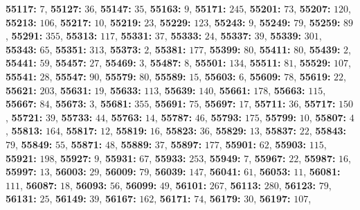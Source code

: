 \textsf{\bfseries 55117:} $7$, \textsf{\bfseries 55127:} $36$, \textsf{\bfseries 55147:} $35$, \textsf{\bfseries 55163:} $9$, \textsf{\bfseries 55171:} $245$, \textsf{\bfseries 55201:} $73$, \textsf{\bfseries 55207:} $120$, \textsf{\bfseries 55213:} $106$, \textsf{\bfseries 55217:} $10$, \textsf{\bfseries 55219:} $23$, \textsf{\bfseries 55229:} $123$, \textsf{\bfseries 55243:} $9$, \textsf{\bfseries 55249:} $79$, \textsf{\bfseries 55259:} $89$, \textsf{\bfseries 55291:} $355$, \textsf{\bfseries 55313:} $117$, \textsf{\bfseries 55331:} $37$, \textsf{\bfseries 55333:} $24$, \textsf{\bfseries 55337:} $39$, \textsf{\bfseries 55339:} $301$, \textsf{\bfseries 55343:} $65$, \textsf{\bfseries 55351:} $313$, \textsf{\bfseries 55373:} $2$, \textsf{\bfseries 55381:} $177$, \textsf{\bfseries 55399:} $80$, \textsf{\bfseries 55411:} $80$, \textsf{\bfseries 55439:} $2$, \textsf{\bfseries 55441:} $59$, \textsf{\bfseries 55457:} $27$, \textsf{\bfseries 55469:} $3$, \textsf{\bfseries 55487:} $8$, \textsf{\bfseries 55501:} $134$, \textsf{\bfseries 55511:} $81$, \textsf{\bfseries 55529:} $107$, \textsf{\bfseries 55541:} $28$, \textsf{\bfseries 55547:} $90$, \textsf{\bfseries 55579:} $80$, \textsf{\bfseries 55589:} $15$, \textsf{\bfseries 55603:} $6$, \textsf{\bfseries 55609:} $78$, \textsf{\bfseries 55619:} $22$, \textsf{\bfseries 55621:} $203$, \textsf{\bfseries 55631:} $19$, \textsf{\bfseries 55633:} $113$, \textsf{\bfseries 55639:} $140$, \textsf{\bfseries 55661:} $178$, \textsf{\bfseries 55663:} $115$, \textsf{\bfseries 55667:} $84$, \textsf{\bfseries 55673:} $3$, \textsf{\bfseries 55681:} $355$, \textsf{\bfseries 55691:} $75$, \textsf{\bfseries 55697:} $17$, \textsf{\bfseries 55711:} $36$, \textsf{\bfseries 55717:} $150$, \textsf{\bfseries 55721:} $39$, \textsf{\bfseries 55733:} $44$, \textsf{\bfseries 55763:} $14$, \textsf{\bfseries 55787:} $46$, \textsf{\bfseries 55793:} $175$, \textsf{\bfseries 55799:} $10$, \textsf{\bfseries 55807:} $4$, \textsf{\bfseries 55813:} $164$, \textsf{\bfseries 55817:} $12$, \textsf{\bfseries 55819:} $16$, \textsf{\bfseries 55823:} $36$, \textsf{\bfseries 55829:} $13$, \textsf{\bfseries 55837:} $22$, \textsf{\bfseries 55843:} $79$, \textsf{\bfseries 55849:} $55$, \textsf{\bfseries 55871:} $48$, \textsf{\bfseries 55889:} $37$, \textsf{\bfseries 55897:} $177$, \textsf{\bfseries 55901:} $62$, \textsf{\bfseries 55903:} $115$, \textsf{\bfseries 55921:} $198$, \textsf{\bfseries 55927:} $9$, \textsf{\bfseries 55931:} $67$, \textsf{\bfseries 55933:} $253$, \textsf{\bfseries 55949:} $7$, \textsf{\bfseries 55967:} $22$, \textsf{\bfseries 55987:} $16$, \textsf{\bfseries 55997:} $13$, \textsf{\bfseries 56003:} $29$, \textsf{\bfseries 56009:} $79$, \textsf{\bfseries 56039:} $147$, \textsf{\bfseries 56041:} $61$, \textsf{\bfseries 56053:} $11$, \textsf{\bfseries 56081:} $111$, \textsf{\bfseries 56087:} $18$, \textsf{\bfseries 56093:} $56$, \textsf{\bfseries 56099:} $49$, \textsf{\bfseries 56101:} $267$, \textsf{\bfseries 56113:} $280$, \textsf{\bfseries 56123:} $79$, \textsf{\bfseries 56131:} $25$, \textsf{\bfseries 56149:} $39$, \textsf{\bfseries 56167:} $162$, \textsf{\bfseries 56171:} $74$, \textsf{\bfseries 56179:} $30$, \textsf{\bfseries 56197:} $107$, 
